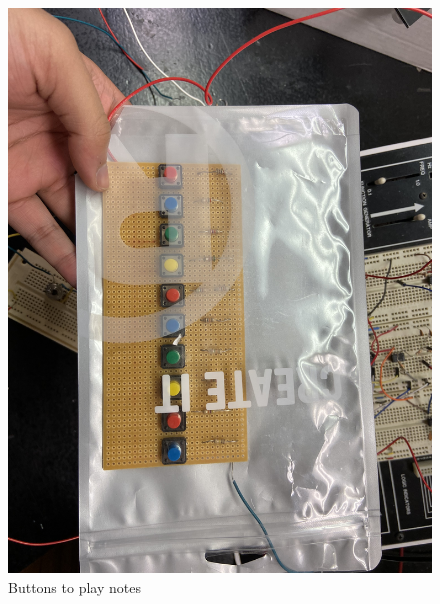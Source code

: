 \documentclass[12pt]{article}
\begin{document}
\newpage
\begin{figure}[h!]
    \centering
    \includegraphics[scale=0.1]{buttons.jpg}
    \caption{Buttons to play notes}
    \label{buttons}
\end{figure}
\end{document}
